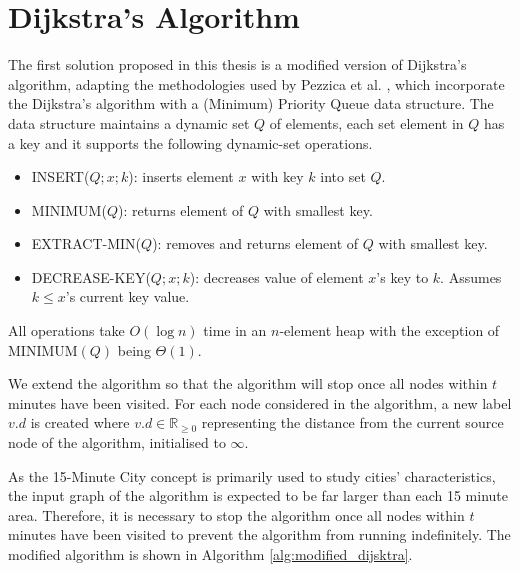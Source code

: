\section{Dijkstra's Algorithm}

The first solution proposed in this thesis is a modified version of Dijkstra's algorithm, adapting the methodologies used by Pezzica et al. \cite{cormen2022introduction}, which incorporate the Dijkstra's algorithm with a (Minimum) Priority Queue data structure. The data structure maintains a dynamic set $Q$ of elements, each set element in $Q$ has a key and it supports the following dynamic-set operations.

\begin{itemize}
    \item INSERT($Q; x; k$): inserts element $x$ with key $k$ into set $Q$.
    \item MINIMUM($Q$): returns element of $Q$ with smallest key.
    \item EXTRACT-MIN($Q$): removes and returns element of $Q$ with smallest key.
    \item DECREASE-KEY($Q;x;k$): decreases value of element $x$'s key to $k$. Assumes $k\leq x$'s current key value.
\end{itemize}

All operations take $O(\log n)$ time in an $n$-element heap with the exception of $\text{MINIMUM}(Q)$ being $\Theta(1)$.

We extend the algorithm so that the algorithm will stop once all nodes within $t$ minutes have been visited. For each node considered in the algorithm, a new label $v.d$ is created where $v.d \in \mathbb{R}_{\geq 0}$ representing the distance from the current source node of the algorithm, initialised to $\infty$.

As the 15-Minute City concept is primarily used to study cities' characteristics, the input graph of the algorithm is expected to be far larger than each 15 minute area. Therefore, it is necessary to stop the algorithm once all nodes within $t$ minutes have been visited to prevent the algorithm from running indefinitely. The modified algorithm is shown in Algorithm \ref{alg:modified_dijsktra}.

